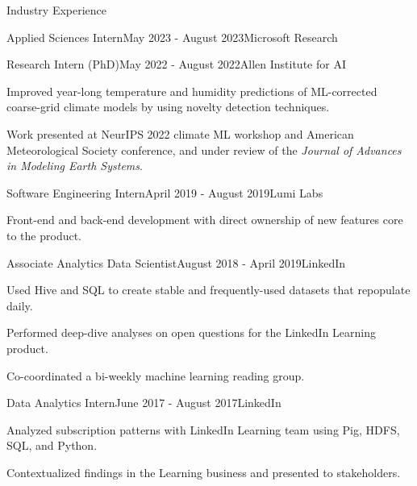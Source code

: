 \documentclass{resume} %
\begin{document}
\begin{rSection}{Industry Experience}

\begin{rSubsection}{Applied Sciences Intern}{May 2023 - August 2023}{Microsoft Research}{}
\end{rSubsection}

\begin{rSubsection}{Research Intern (PhD)}{May 2022 - August 2022}{Allen Institute for AI}{}
\item Improved year-long temperature and humidity predictions of ML-corrected coarse-grid climate models by using novelty detection techniques.
\item Work presented at NeurIPS 2022 climate ML workshop and American Meteorological Society conference, and under review of the \textit{Journal of Advances in Modeling Earth Systems}.
\end{rSubsection}

\begin{rSubsection}{Software Engineering Intern}{April 2019 - August 2019}{Lumi Labs}{}
\item Front-end and back-end development with direct ownership of new features core to the product.
\end{rSubsection}

\begin{rSubsection}{Associate Analytics Data Scientist}{August 2018 - April 2019}{LinkedIn}{}
\item Used Hive and SQL to create stable and frequently-used datasets that repopulate daily. 
\item Performed deep-dive analyses on open questions for the LinkedIn Learning product.
\item Co-coordinated a bi-weekly machine learning reading group.
\end{rSubsection}

\begin{rSubsection}{Data Analytics Intern}{June 2017 - August 2017}{LinkedIn}{}
\item Analyzed subscription patterns with LinkedIn Learning team using Pig, HDFS, SQL, and Python.
\item Contextualized findings in the Learning business and presented to stakeholders.
\end{rSubsection}

\end{rSection}
\end{document}

